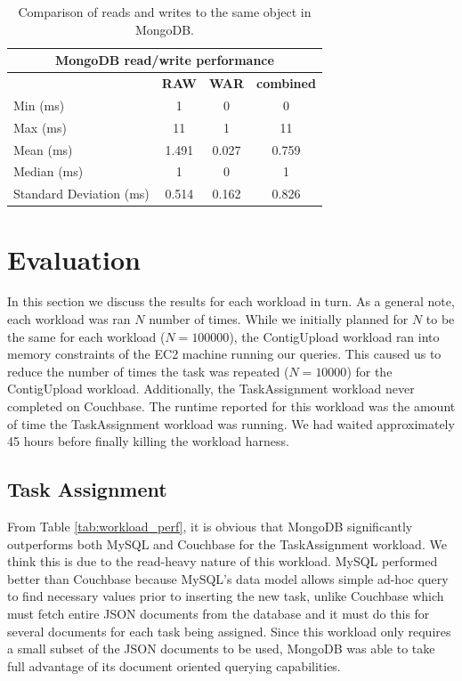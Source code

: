 \documentclass[12pt]{ucthesis}
\begin{document}
\begin{table}[t]
   \centering
      \begin{tabular}{| l | c | c | c |}
         \hline
            \multicolumn{4}{|c|}{{\textbf{MongoDB read/write performance}}} \\
         \hline
            & \textbf{RAW} & \textbf{WAR} & \textbf{combined} \\
         \hline
            Min (ms) & 1 & 0 & 0 \\
         \hline
            Max (ms) & 11 & 1 & 11 \\
         \hline
            Mean (ms) & 1.491 & 0.027 & 0.759 \\
         \hline
            Median (ms) & 1 & 0 & 1 \\
         \hline
            Standard Deviation (ms) & 0.514 & 0.162 & 0.826 \\
         \hline
      \end{tabular}
      \caption{Comparison of reads and writes to the same object in MongoDB.}
      \label{tab:mongo_perf}
\end{table}

\section{Evaluation}\label{sec:eval}
In this section we discuss the results for each workload in turn. As a general
note, each workload was ran $N$ number of times.
While we initially planned for $N$ to be the same for each workload
($N=100000$), the ContigUpload workload ran into memory constraints of the
EC2 machine running our queries. This caused us to reduce the number of times
the task was repeated ($N=10000$) for the ContigUpload workload.
Additionally, the TaskAssignment workload never completed on Couchbase. The
runtime reported for this workload was the amount of time the TaskAssignment
workload was running. We had waited approximately 45 hours before finally killing
the workload harness.

\subsection{Task Assignment}
From Table \ref{tab:workload_perf}, it is obvious that MongoDB significantly
outperforms both MySQL and Couchbase for the TaskAssignment workload. We think this is due to
the read-heavy nature of this workload. MySQL performed better
than Couchbase because MySQL's data model allows
simple ad-hoc query to find necessary values prior to inserting the new task, unlike
Couchbase which must fetch entire JSON documents from the database and it must do
this for several documents for each task being assigned. Since this workload only requires
 a small subset of the JSON documents to be
used, MongoDB was able to take full advantage of its document oriented querying capabilities.
\end{document}
